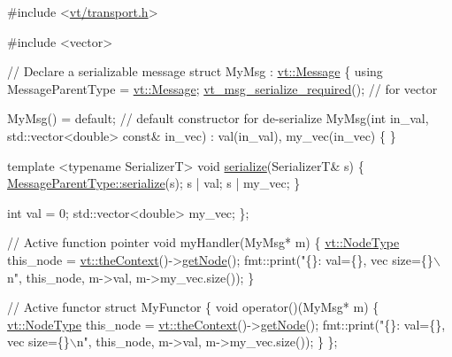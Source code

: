 \begin{DoxyCode}
\textcolor{preprocessor}{#include <\hyperlink{transport_8h}{vt/transport.h}>}

\textcolor{preprocessor}{#include <vector>}

\textcolor{comment}{// Declare a serializable message}
\textcolor{keyword}{struct }MyMsg : \hyperlink{structvt_1_1messaging_1_1_active_msg}{vt::Message} \{
  \textcolor{keyword}{using} MessageParentType = \hyperlink{namespacevt_a3a3ddfef40b4c90915fa43cdd5f129ea}{vt::Message};
  \hyperlink{message__serialize_8h_a54128d5338aaa9c918179826085e13d1}{vt\_msg\_serialize\_required}(); \textcolor{comment}{// for vector}

  MyMsg() = \textcolor{keywordflow}{default}; \textcolor{comment}{// default constructor for de-serialize}
  MyMsg(\textcolor{keywordtype}{int} in\_val, std::vector<double> \textcolor{keyword}{const}& in\_vec)
    : val(in\_val),
      my\_vec(in\_vec)
  \{ \}

  \textcolor{keyword}{template} <\textcolor{keyword}{typename} SerializerT>
  \textcolor{keywordtype}{void} \hyperlink{structvt_1_1messaging_1_1_active_msg_a758f02bef5991c48d6c9a56c30ca7ad9}{serialize}(SerializerT& s) \{
    \hyperlink{namespacevt_1_1vrt_1_1collection_1_1balance_a783d95de203cabd0f599440e9869c313}{MessageParentType::serialize}(s);
    s | val;
    s | my\_vec;
  \}

  \textcolor{keywordtype}{int} val = 0;
  std::vector<double> my\_vec;
\};

\textcolor{comment}{// Active function pointer}
\textcolor{keywordtype}{void} myHandler(MyMsg* m) \{
  \hyperlink{namespacevt_a866da9d0efc19c0a1ce79e9e492f47e2}{vt::NodeType} this\_node = \hyperlink{namespacevt_a26551fe0e6e6a1371111df5b12c7e92c}{vt::theContext}()->\hyperlink{structvt_1_1ctx_1_1_context_a0d52c263ce8516546a67443d9a86fa5f}{getNode}();
  fmt::print(\textcolor{stringliteral}{"\{\}: val=\{\}, vec size=\{\}\(\backslash\)n"}, this\_node, m->val, m->my\_vec.size());
\}

\textcolor{comment}{// Active functor}
\textcolor{keyword}{struct }MyFunctor \{
  \textcolor{keywordtype}{void} operator()(MyMsg* m) \{
    \hyperlink{namespacevt_a866da9d0efc19c0a1ce79e9e492f47e2}{vt::NodeType} this\_node = \hyperlink{namespacevt_a26551fe0e6e6a1371111df5b12c7e92c}{vt::theContext}()->\hyperlink{structvt_1_1ctx_1_1_context_a0d52c263ce8516546a67443d9a86fa5f}{getNode}();
    fmt::print(\textcolor{stringliteral}{"\{\}: val=\{\}, vec size=\{\}\(\backslash\)n"}, this\_node, m->val, m->my\_vec.size());
  \}
\};


\end{DoxyCode}
